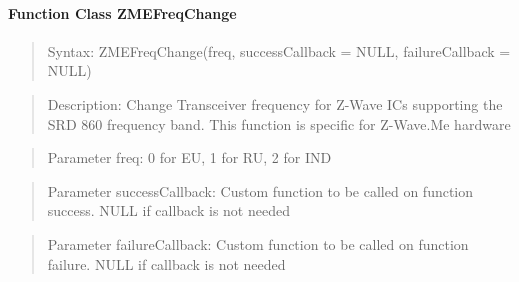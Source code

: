 \paragraph {Function Class ZMEFreqChange}
\begin{quote} Syntax: ZMEFreqChange(freq, successCallback = NULL, failureCallback = NULL)\end{quote}
\begin{quote} Description: Change Transceiver frequency for Z-Wave ICs supporting the SRD 860 frequency band. 
This function is specific for Z-Wave.Me hardware\end{quote}
\begin{quote} Parameter freq: 0 for EU, 1 for RU, 2 for IND\end{quote}
\begin{quote} Parameter successCallback: Custom function to be called on function success. NULL if callback is not needed\end{quote} 
\begin{quote} Parameter failureCallback: Custom function to be called on function failure. NULL if callback is not needed\end{quote} 

